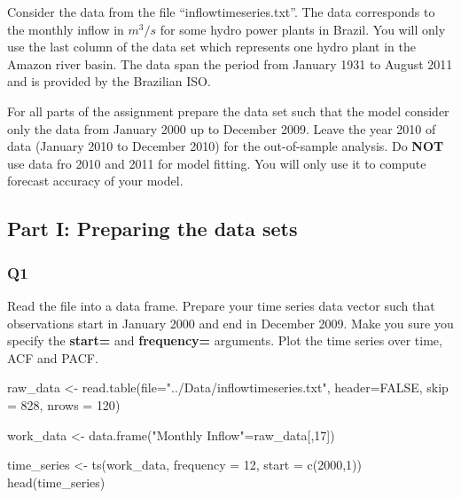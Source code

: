\documentclass[
]{article}
\newenvironment{Shaded}{\begin{snugshade}}{\end{snugshade}}
\newcommand{\AttributeTok}[1]{\textcolor[rgb]{0.77,0.63,0.00}{#1}}
\newcommand{\ConstantTok}[1]{\textcolor[rgb]{0.00,0.00,0.00}{#1}}
\newcommand{\DecValTok}[1]{\textcolor[rgb]{0.00,0.00,0.81}{#1}}
\newcommand{\FunctionTok}[1]{\textcolor[rgb]{0.00,0.00,0.00}{#1}}
\newcommand{\NormalTok}[1]{#1}
\newcommand{\OtherTok}[1]{\textcolor[rgb]{0.56,0.35,0.01}{#1}}
\newcommand{\StringTok}[1]{\textcolor[rgb]{0.31,0.60,0.02}{#1}}
\begin{document}
Consider the data from the file ``inflowtimeseries.txt''. The data
corresponds to the monthly inflow in \(m^{3}/s\) for some hydro power
plants in Brazil. You will only use the last column of the data set
which represents one hydro plant in the Amazon river basin. The data
span the period from January 1931 to August 2011 and is provided by the
Brazilian ISO.

For all parts of the assignment prepare the data set such that the model
consider only the data from January 2000 up to December 2009. Leave the
year 2010 of data (January 2010 to December 2010) for the out-of-sample
analysis. Do \textbf{NOT} use data fro 2010 and 2011 for model fitting.
You will only use it to compute forecast accuracy of your model.

\hypertarget{part-i-preparing-the-data-sets}{%
\subsection{Part I: Preparing the data
sets}\label{part-i-preparing-the-data-sets}}

\hypertarget{q1}{%
\subsubsection{Q1}\label{q1}}

Read the file into a data frame. Prepare your time series data vector
such that observations start in January 2000 and end in December 2009.
Make you sure you specify the \textbf{start=} and \textbf{frequency=}
arguments. Plot the time series over time, ACF and PACF.

\begin{Shaded}
\begin{Highlighting}[]
\NormalTok{raw\_data }\OtherTok{\textless{}{-}} \FunctionTok{read.table}\NormalTok{(}\AttributeTok{file=}\StringTok{"../Data/inflowtimeseries.txt"}\NormalTok{, }\AttributeTok{header=}\ConstantTok{FALSE}\NormalTok{, }\AttributeTok{skip =} \DecValTok{828}\NormalTok{, }\AttributeTok{nrows =} \DecValTok{120}\NormalTok{)}

\NormalTok{work\_data }\OtherTok{\textless{}{-}} \FunctionTok{data.frame}\NormalTok{(}\StringTok{"Monthly Inflow"}\OtherTok{=}\NormalTok{raw\_data[,}\DecValTok{17}\NormalTok{])}

\NormalTok{time\_series }\OtherTok{\textless{}{-}} \FunctionTok{ts}\NormalTok{(work\_data, }\AttributeTok{frequency =} \DecValTok{12}\NormalTok{, }\AttributeTok{start =} \FunctionTok{c}\NormalTok{(}\DecValTok{2000}\NormalTok{,}\DecValTok{1}\NormalTok{))}
\FunctionTok{head}\NormalTok{(time\_series)}
\end{Highlighting}
\end{Shaded}
\end{document}
